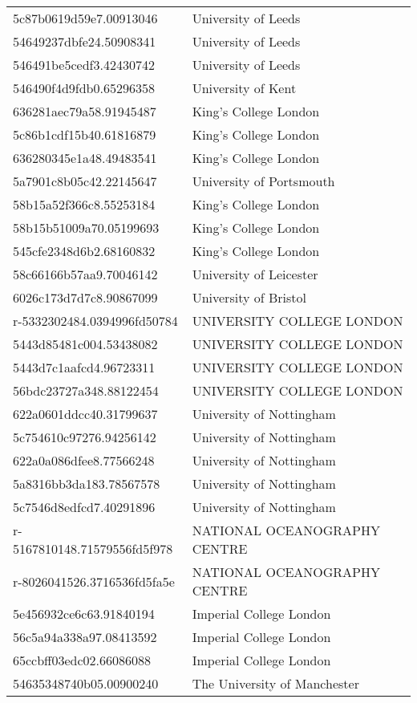 \begin{tabular}{ll}
5c87b0619d59e7.00913046 & University of Leeds \\
54649237dbfe24.50908341 & University of Leeds \\
546491be5cedf3.42430742 & University of Leeds \\
546490f4d9fdb0.65296358 & University of Kent \\
636281aec79a58.91945487 & King's College London \\
5c86b1cdf15b40.61816879 & King's College London \\
636280345e1a48.49483541 & King's College London \\
5a7901c8b05c42.22145647 & University of Portsmouth \\
58b15a52f366c8.55253184 & King's College London \\
58b15b51009a70.05199693 & King's College London \\
545cfe2348d6b2.68160832 & King's College London \\
58c66166b57aa9.70046142 & University of Leicester \\
6026c173d7d7c8.90867099 & University of Bristol \\
r-5332302484.0394996fd50784 & UNIVERSITY COLLEGE LONDON \\
5443d85481c004.53438082 & UNIVERSITY COLLEGE LONDON \\
5443d7c1aafcd4.96723311 & UNIVERSITY COLLEGE LONDON \\
56bdc23727a348.88122454 & UNIVERSITY COLLEGE LONDON \\
622a0601ddcc40.31799637 & University of Nottingham \\
5c754610c97276.94256142 & University of Nottingham \\
622a0a086dfee8.77566248 & University of Nottingham \\
5a8316bb3da183.78567578 & University of Nottingham \\
5c7546d8edfcd7.40291896 & University of Nottingham \\
r-5167810148.71579556fd5f978 & NATIONAL OCEANOGRAPHY CENTRE \\
r-8026041526.3716536fd5fa5e & NATIONAL OCEANOGRAPHY CENTRE \\
5e456932ce6c63.91840194 & Imperial College London \\
56c5a94a338a97.08413592 & Imperial College London \\
65ccbff03edc02.66086088 & Imperial College London \\
54635348740b05.00900240 & The University of Manchester \\

\end{tabular}
